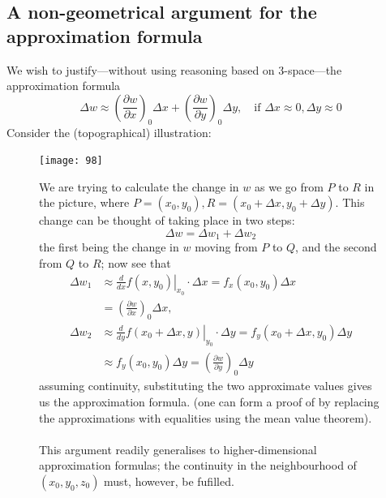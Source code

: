 \documentclass{report}
\begin{document}
\subsection{A non-geometrical argument for the approximation formula} %
We wish to justify---without using reasoning based on 3-space---the approximation formula
\begin{equation*}
\Delta w\approx\left(\frac{\partial w}{\partial x}\right)_0\Delta x+
\left(\frac{\partial w}{\partial y}\right)_0\Delta y,
\quad\text{if }\Delta x\approx0,\Delta y\approx0
\end{equation*}
Consider the (topographical) illustration:
\begin{figure}[h]
\begin{center}
\texttt{[image: 98]}\\
\end{center}
We are trying to calculate the change in $w$ as we go from $P$ to $R$ in the picture, where 
$P=(x_0,y_0),R=(x_0+\Delta x,y_0+\Delta y)$. This change can be thought of taking place in two steps:
\begin{equation*}
\Delta w=\Delta w_1+\Delta w_2
\end{equation*}
the first being the change in $w$ moving from $P$ to $Q$, and the second from $Q$ to $R$; now see that
\begin{align*}
\Delta w_1&\approx\left.\frac{d}{dx}f(x,y_0)\right|_{x_0}\cdot\Delta x
=f_x(x_0,y_0)\Delta x\\
&=\left(\frac{\partial w}{\partial x}\right)_0\Delta x,\\
\Delta w_2&\approx\left.\frac{d}{dy}f(x_0+\Delta x,y)\right|_{y_0}\cdot\Delta y
=f_y(x_0+\Delta x,y_0)\Delta y\\
&\approx f_y(x_0,y_0)\Delta y
=\left(\frac{\partial w}{\partial y}\right)_0\Delta y
\end{align*}
assuming continuity, substituting the two approximate values gives us the approximation formula. (one can form a
proof of by replacing the approximations with equalities using the mean value theorem).\\
\vspace{1mm}\\
This argument readily generalises to higher-dimensional approximation formulas; the continuity in the neighbourhood
of $(x_0,y_0,z_0)$ must, however, be fufilled.
\end{figure}
\newpage
\end{document}
